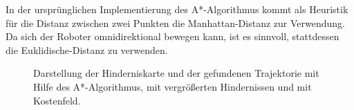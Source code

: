 In der ursprünglichen Implementierung des A*-Algorithmus kommt als Heuristik für die Distanz zwischen zwei Punkten die \gls{Manhattan-Distanz} zur Verwendung.
Da sich der Roboter omnidirektional bewegen kann, ist es sinnvoll, stattdessen die \gls{Euklidische-Distanz} zu verwenden.
\begin{figure}[h]
	\centering
	\label{fig:bahnplanung_umsetzung_algorithm}
	\quad
	\quad
	\caption[Hinderniskarte und Trajektorie mit A*-Alg.]{Darstellung der Hinderniskarte und der gefundenen Trajektorie mit Hilfe des A*-Algorithmus, mit vergrößerten Hindernissen und mit Kostenfeld.}
\end{figure}
